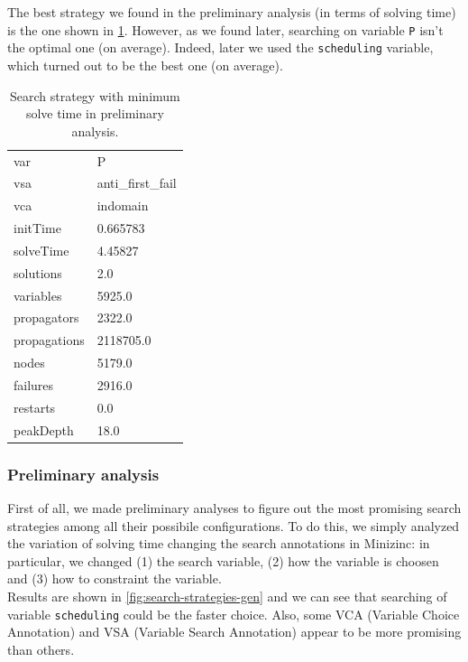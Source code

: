 \documentclass[10pt]{article}
\begin{document}
	The best strategy we found in the preliminary analysis (in terms of solving time) is the one shown
	in \cref{tab:best-strategy}. However, as we found later, searching on variable \texttt{P}
	isn't the optimal one (on average). 
	Indeed, later we used the \texttt{scheduling} variable, which turned out to be 
	the best one (on average).

	\begin{table}[h]
		\centering
		\scriptsize
		\begin{tabular}{ll}
			\toprule
			var          &                P \\
			vsa          &  anti\_first\_fail\\
			vca          &         indomain \\
			\midrule
			initTime     &         0.665783 \\
			solveTime    &          4.45827 \\
			solutions    &              2.0 \\
			variables    &           5925.0 \\
			propagators  &           2322.0 \\
			propagations &        2118705.0 \\
			nodes        &           5179.0 \\
			failures     &           2916.0 \\
			restarts     &              0.0 \\
			peakDepth    &             18.0 \\
			\bottomrule
		\end{tabular}
		\caption{Search strategy with minimum solve time in preliminary analysis.}
		\label{tab:best-strategy}
	\end{table}

	

	\subsubsection{Preliminary analysis}
	\label{subsubsec:preliminary-analysis}
	
	First of all, we made preliminary analyses to figure out the most promising
	search strategies among all their possibile configurations. To do this,
	we simply analyzed the variation of solving time changing the search 
	annotations in Minizinc: in particular, we changed (1) the search 
	variable, (2) how the variable is choosen and (3) how to constraint
	the variable. \\Results are shown in \cref{fig:search-strategies-gen} 
	and we can see that searching of variable \texttt{scheduling} could be 
	the faster choice. Also, some VCA (Variable Choice Annotation) and VSA 
	(Variable Search Annotation) appear to be more promising than others. 
\end{document}
